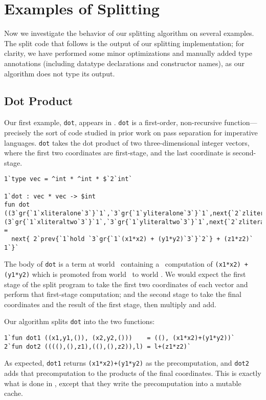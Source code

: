  \section{Examples of Splitting}
\label{sec:examples}

Now we investigate the behavior of our splitting algorithm on several examples.
The split code that follows is the output of our splitting implementation; for
clarity, we have performed some minor optimizations and manually added type
annotations (including datatype declarations and constructor names), as our
algorithm does not type its output.

\subsection{Dot Product}

Our first example, \texttt{dot}, appears in \cite{knoblock96}. \texttt{dot} is a
first-order, non-recursive function---precisely the sort of code studied in
prior work on pass separation for imperative languages. \texttt{dot} takes the
dot product of two three-dimensional integer vectors, where the first two
coordinates are first-stage, and the last coordinate is second-stage. 
%
\begin{lstlisting} 
1`type vec = ^int * ^int * $`2`int`

1`dot : vec * vec -> $int
fun dot ((3`gr{`1`xliteralone`3`}`1`,`3`gr{`1`yliteralone`3`}`1`,next{`2`zliteralone`1`}),(3`gr{`1`xliteraltwo`3`}`1`,`3`gr{`1`yliteraltwo`3`}`1`,next{`2`zliteraltwo`1`})) = 
  next{ 2`prev{`1`hold `3`gr{`1`(x1*x2) + (y1*y2)`3`}`2`} + (z1*z2)` 1`}`
\end{lstlisting}
%
The body of \texttt{dot} is a \rmint{} term at world \bbtwo\ containing a
\rmint\ computation of \texttt{(x1*x2) + (y1*y2)} which is promoted from world
\bbonep\ to world \bbtwo. We would expect the first stage of the split program
to take the first two coordinates of each vector and perform that first-stage
computation; and the second stage to take the final coordinates and the result
of the first stage, then multiply and add.

Our algorithm splits \texttt{dot} into the two functions:
%
\begin{lstlisting} 
1`fun dot1 ((x1,y1,()), (x2,y2,()))    = ((), (x1*x2)+(y1*y2))`
2`fun dot2 ((((),(),z1),((),(),z2)),l) = l+(z1*z2)`
\end{lstlisting}
%
As expected, \texttt{dot1} returns \texttt{(x1*x2)+(y1*y2)} as the
precomputation, and \texttt{dot2} adds that precomputation to the products of
the final coordinates. This is exactly what is done in \cite{knoblock96}, except
that they write the precomputation into a mutable cache.

